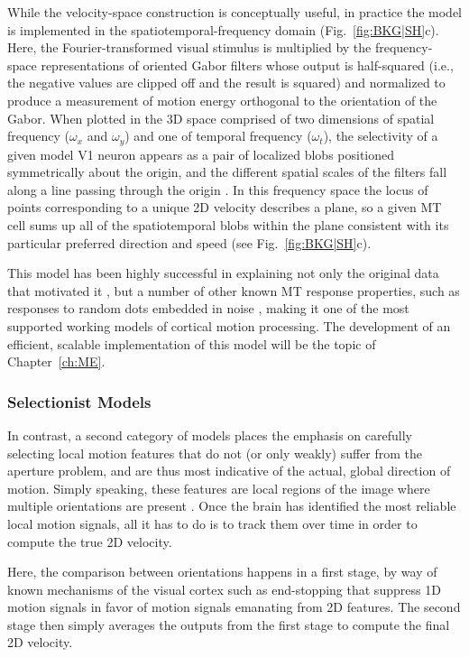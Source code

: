 While the velocity-space construction is conceptually useful, 
in practice the model is implemented in the spatiotemporal-frequency domain
(Fig.~\ref{fig:BKG|SH}c).
Here, the Fourier-transformed visual stimulus is multiplied by the
frequency-space representations of oriented Gabor filters whose output is
half-squared (i.e., the negative values are clipped off and the result is squared)
and normalized to produce a measurement of motion energy \citep{AdelsonBergen1985}
orthogonal to the orientation of the Gabor.
When plotted in the 3D space comprised of two dimensions of spatial frequency
($\omega_x$ and $\omega_y$) and one of temporal frequency ($\omega_t$),
the selectivity of a given model \ac{V1} neuron appears as a pair of 
localized blobs positioned symmetrically about the origin, 
and the different spatial scales of the filters fall along a line 
passing through the origin 
\citep{AdelsonBergen1985,Heeger1996,SimoncelliHeeger1998}.
In this frequency space the locus of points corresponding to a unique 2D velocity
describes a plane, so a given \ac{MT} cell sums up all of the spatiotemporal blobs
within the plane consistent with its particular preferred direction and speed
(see Fig.~\ref{fig:BKG|SH}c).

This model has been highly successful in explaining not only the original
data that motivated it \citep{Movshon1985,RodmanAlbright1987,RodmanAlbright1989}, but a number of other known \ac{MT} response properties,
such as responses to random dots embedded in noise
\citep{Newsome1989,Britten1992}, making it 
one of the most supported working models of cortical motion processing.
The development of an efficient, scalable implementation of this model will be
the topic of Chapter~\ref{ch:ME}.


\subsubsection{Selectionist Models}
In contrast, a second category of models places the emphasis on carefully
selecting local motion features that do not (or only weakly) suffer from
the aperture problem, and are thus most indicative of the actual, global
direction of motion.
Simply speaking, these features are local regions of the image where multiple
orientations are present \citep{PackBorn2008}.
Once the brain has identified the most reliable local motion signals,
all it has to do is to track them over time in order to compute the true
2D velocity.

Here, the comparison between orientations happens in a first stage,
by way of known mechanisms of the visual cortex such as end-stopping
that suppress 1D motion signals in favor of motion signals emanating from
2D features.
The second stage then simply averages the outputs from the first stage
to compute the final 2D velocity.

